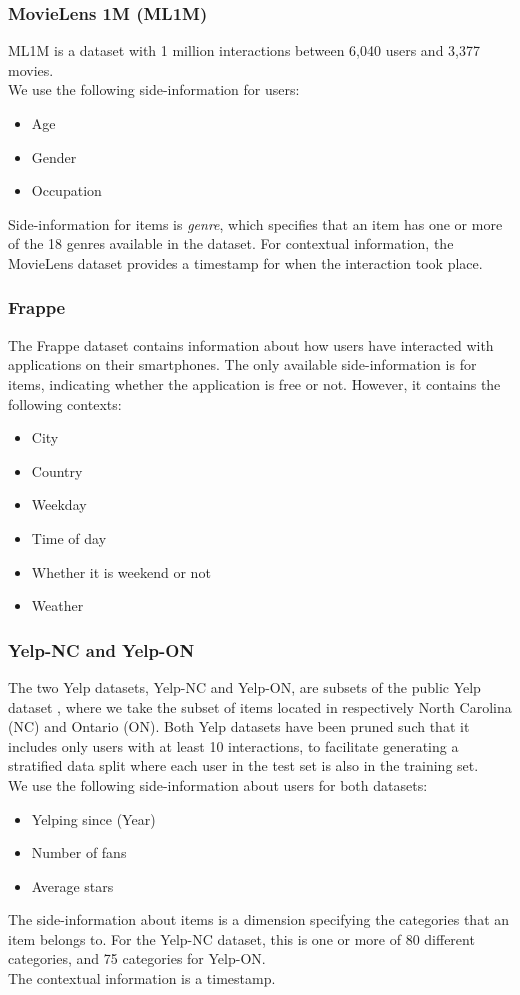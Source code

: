 \subsubsection*{MovieLens 1M (ML1M)}
ML1M is a dataset \cite{ml1m} with 1 million interactions between 6,040 users and 3,377 movies.\\
We use the following side-information for users:
\begin{itemize}
    \item Age
    \item Gender
    \item Occupation
\end{itemize}
Side-information for items is \textit{genre}, which specifies that an item has one or more of the 18 genres available in the dataset.
For contextual information, the MovieLens dataset provides a timestamp for when the interaction took place.

\subsubsection*{Frappe}
The Frappe dataset \cite{baltrunasfrappe} contains information about how users have interacted with applications on their smartphones.
The only available side-information is for items, indicating whether the application is free or not.
However, it contains the following contexts:
\begin{itemize}
    \item City
    \item Country
    \item Weekday
    \item Time of day
    \item Whether it is weekend or not
    \item Weather
\end{itemize}

\subsubsection*{Yelp-NC and Yelp-ON}
The two Yelp datasets, Yelp-NC and Yelp-ON, are subsets of the public Yelp dataset \cite{yelp}, where we take the subset of items located in respectively North Carolina (NC) and Ontario (ON).
Both Yelp datasets have been pruned such that it includes only users with at least 10 interactions, to facilitate generating a stratified data split where each user in the test set is also in the training set.\\
We use the following side-information about users for both datasets:
\begin{itemize}
    \item Yelping since (Year)
    \item Number of fans
    \item Average stars
\end{itemize}
The side-information about items is a dimension specifying the categories that an item belongs to.
For the Yelp-NC dataset, this is one or more of 80 different categories, and 75 categories for Yelp-ON.\\
The contextual information is a timestamp.

